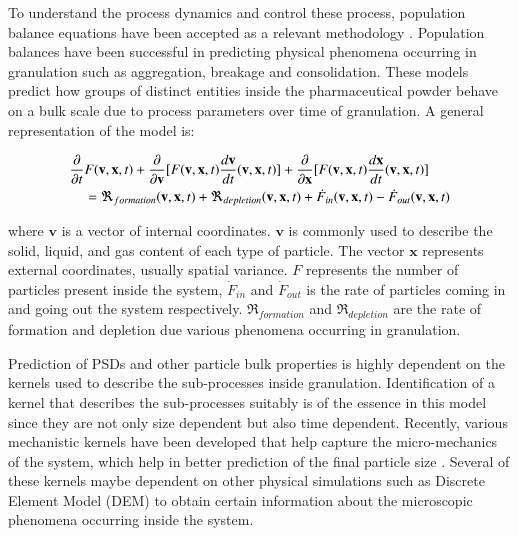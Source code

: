 \documentclass[preprint,10pt,authoryear,review]{elsarticle}
\begin{document}
\begin{linenumbers}
To understand the process dynamics and control these process, population balance equations 
have been accepted as a relevant methodology \citep{Immanuel2005}. Population balances have been successful in 
predicting physical phenomena occurring in granulation such as aggregation, breakage and 
consolidation. These models predict how groups of distinct entities inside the pharmaceutical 
powder behave on a bulk scale due to process parameters over time of granulation. A
general representation of the model is:

\begin{align}
\frac{ \partial}{\partial t}&F(\textbf{v},\textbf{x},t) + \frac{\partial}{\partial 
\textbf{v}}[F(\textbf{v},\textbf{x},t)\frac{d\textbf{v}}{dt}(\textbf{v},\textbf{x},t)] 
+ \frac{\partial}{\partial \textbf{x}}[F(\textbf{v},\textbf{x},t)\frac{d\textbf{x}}{dt}
(\textbf{v},\textbf{x},t)] \notag\\
    &= 
\Re_{formation}(\textbf{v},\textbf{x},t)+\Re_{depletion}(\textbf{v},\textbf{x},t)
+\dot{F}_{in}(\textbf{v},\textbf{x},t) -\dot{F}_{out}(\textbf{v},\textbf{x},t) 
\label{eqn:bkgd_pbm_general} 
\end{align}

where $\textbf{v}$ is a vector of internal 
coordinates.  $\textbf{v}$ is commonly used to describe the solid, liquid, 
and gas content of each type of particle. The vector $\textbf{x}$ represents 
external coordinates, usually spatial variance. $F$ represents the 
number of particles present inside the system, $\dot{F}_{in}$ 
and $\dot{F}_{out}$ is the rate of particles coming in and going out the 
system respectively. $\Re_{formation}$ and $\Re_{depletion}$ are the rate of 
formation and depletion due various phenomena occurring in granulation. 

Prediction of PSDs and other particle bulk properties is highly dependent on 
the kernels used to describe the sub-processes inside granulation. Identification 
of a kernel that describes the sub-processes suitably is of the essence in this model 
since they are not only size dependent but also time dependent. Recently, various 
mechanistic kernels have been developed that help capture the micro-mechanics of the 
system, which help in better prediction of the final particle size \citep{Barrasso2015processes}. 
Several of these kernels maybe dependent on other physical simulations such as Discrete 
Element Model (DEM) to obtain certain information about the microscopic phenomena 
occurring inside the system.



\end{linenumbers}
\end{document}
